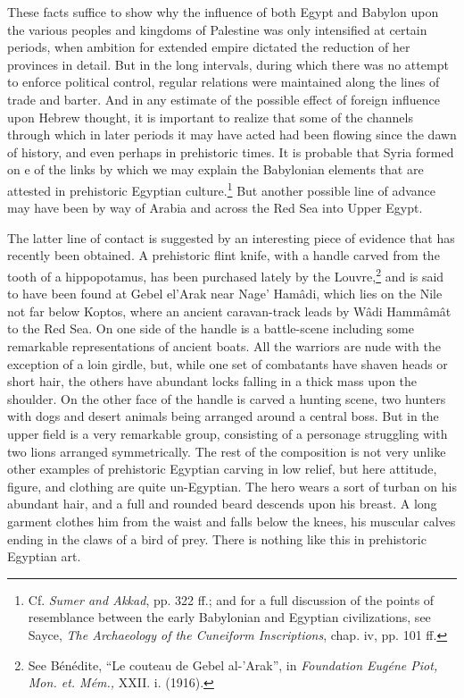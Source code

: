\documentclass[12pt,oneside]{book}
\begin{document}
These facts suffice to show why the influence of both Egypt and Babylon upon the various peoples and kingdoms of Palestine was only intensified at certain periods, when ambition for extended empire dictated the reduction of her provinces in detail. But in the long intervals, during which there was no attempt to enforce political control, regular relations were maintained along the lines of trade and barter. And in any estimate of the possible effect of foreign influence upon Hebrew thought, it is important to realize that some of the channels through which in later periods it may have acted had been flowing since the dawn of history, and even perhaps in prehistoric times. It is probable that Syria formed on e of the links by which we may explain the Babylonian elements that are attested in prehistoric Egyptian culture.\footnote{Cf. \textit{Sumer and Akkad}, pp. 322 ff.; and for a full discussion of the points of resemblance between the early Babylonian and Egyptian civilizations, see Sayce, \textit{The Archaeology of the Cuneiform Inscriptions}, chap. iv, pp. 101 ff.} But another possible line of advance may have been by way of Arabia and across the Red Sea into Upper Egypt. \par 

The latter line of contact is suggested by an interesting piece of evidence that has recently been obtained. A prehistoric flint knife, with a handle carved from the tooth of a hippopotamus, has been purchased lately by the Louvre,\footnote{See B\'en\'edite, ``Le couteau de Gebel al-'Arak'', in \textit{Foundation Eug\'ene Piot, Mon. et. M\'em.,} XXII. i. (1916).} and is said to have been found at Gebel el'Arak near Nage' Ham\^adi, which lies on the Nile not far below Koptos, where an ancient caravan-track leads by W\^adi Hamm\^am\^at to the Red Sea. On one side of the handle is a battle-scene including some remarkable representations of ancient boats. All the warriors are nude with the exception of a loin girdle, but, while one set of combatants have shaven heads or short hair, the others have abundant locks falling in a thick mass upon the shoulder. On the other face of the handle is carved a hunting scene, two hunters with dogs and desert animals being arranged around a central boss. But in the upper field is a very remarkable group, consisting of a personage struggling with two lions arranged symmetrically. The rest of the composition is not very unlike other examples of prehistoric Egyptian carving in low relief, but here attitude, figure, and clothing are quite un-Egyptian. The hero wears a sort of turban on his abundant hair, and a full and rounded beard descends upon his breast. A long garment clothes him from the waist and falls below the knees, his muscular calves ending in the claws of a bird of prey. There is nothing like this in prehistoric Egyptian art. \par 
\end{document}
